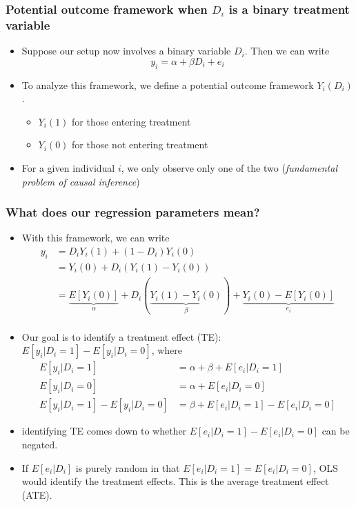 \documentclass[aspectratio=169]{beamer}
\begin{document}
\begin{frame}
\frametitle{Potential outcome framework when $D_i$ is a binary treatment variable}
\begin{itemize}
\item Suppose our setup now involves a binary variable $D_i$. Then we can write
\[
y_i = \alpha+\beta D_i +e_i
\]
\item To analyze this framework, we define a potential outcome framework $Y_i(D_i)$. 
\begin{itemize}
\item $Y_i(1)$ for those entering treatment
\item $Y_i(0)$ for those not entering treatment
\end{itemize}
\item For a given individual $i$, we only observe only one of the two (\textit{fundamental problem of causal inference})
\end{itemize}
\end{frame}

\begin{frame}
\frametitle{What does our regression parameters mean?}
\begin{itemize}
\item  With this framework, we can write
\[
\begin{aligned}
y_i& = D_iY_i(1)+(1-D_i)Y_i(0)\\
&=Y_i(0)+D_i(Y_i(1)-Y_i(0))\\
&=\underbrace{E[Y_i(0)]}_{\alpha}+D_i(\underbrace{Y_i(1)-Y_i(0)}_{\beta})+\underbrace{Y_i(0)-E[Y_i(0)]}_{e_i}\\
\end{aligned}
\]
\item Our goal is to identify a treatment effect (TE): $E[y_i|D_i=1]-E[y_i|D_i=0]$, where 
\[
\begin{aligned}
E[y_i|D_i=1]&=\alpha+\beta +E[e_i|D_i=1]\\
E[y_i|D_i=0]&=\alpha+E[e_i|D_i=0]\\
E[y_i|D_i=1]-E[y_i|D_i=0]&=\beta + E[e_i|D_i=1]- E[e_i|D_i=0]
\end{aligned}
\]
\item identifying TE comes down to whether $E[e_i|D_i=1]- E[e_i|D_i=0]$ can be negated. 
\item If $E[e_i|D_i]$ is purely random in that $E[e_i|D_i=1] = E[e_i|D_i=0]$,  OLS would identify the treatment effects. This is the average treatment effect (ATE). \end{itemize}
\end{frame}
\end{document}
